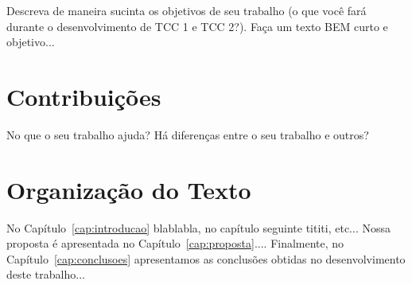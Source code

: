 Descreva de maneira sucinta os objetivos de seu trabalho (o que você fará durante o desenvolvimento de TCC 1 e TCC 2?). Faça um texto BEM curto e objetivo...

\section{Contribuições}
\label{cap:introducao:sec:contribuicoes}

No que o seu trabalho ajuda? Há diferenças entre o seu trabalho e outros?

\section{Organização do Texto}
\label{cap:introducao:sec:organizacao:texto}

No Capítulo~\ref{cap:introducao} blablabla, no capítulo seguinte tititi, etc... Nossa proposta é apresentada no Capítulo~\ref{cap:proposta}.... Finalmente, no Capítulo~\ref{cap:conclusoes} apresentamos as conclusões obtidas no desenvolvimento deste trabalho...